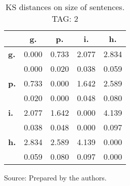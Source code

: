 \begin{table}[h!]
\begin{center}
\caption{KS distances on size of sentences. TAG: 2}
\begin{tabular}{| l || c | c | c | c |}\hline
 & {\bf g.} & {\bf p.} & {\bf i.} & {\bf h.} \\\hline\hline
{\bf g.} & 0.000 & 0.733 & 2.077 & 2.834 \\
{\bf } & 0.000 & 0.020 & 0.038 & 0.059 \\\hline
{\bf p.} & 0.733 & 0.000 & 1.642 & 2.589 \\
{\bf } & 0.020 & 0.000 & 0.048 & 0.080 \\\hline
{\bf i.} & 2.077 & 1.642 & 0.000 & 4.139 \\
{\bf } & 0.038 & 0.048 & 0.000 & 0.097 \\\hline
{\bf h.} & 2.834 & 2.589 & 4.139 & 0.000 \\
{\bf } & 0.059 & 0.080 & 0.097 & 0.000 \\\hline
\end{tabular}
\begin{flushleft}
		Source: Prepared by the authors.\
\end{flushleft}
\end{center}
\end{table}

